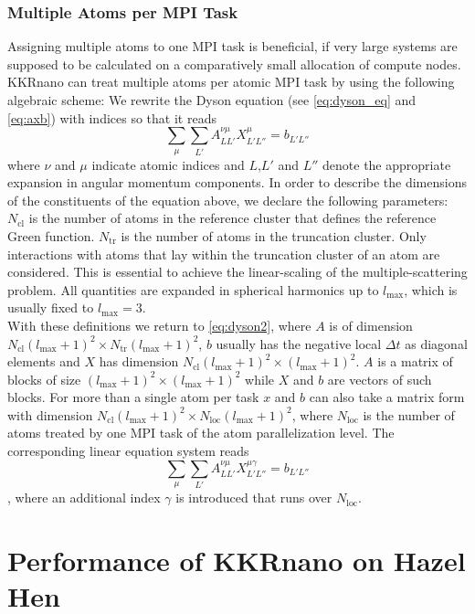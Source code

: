 \documentclass [a4paper, 12pt]{article}
\newcommand{\beq}{\begin{equation}}
\newcommand{\eeq}{\end{equation}}
\begin{document}
\subsubsection*{Multiple Atoms per MPI Task}

Assigning multiple atoms to one MPI task is beneficial, if very large systems are
supposed to be calculated on a comparatively small allocation of compute nodes.
\\
KKRnano can treat multiple atoms per atomic MPI task by using the following algebraic scheme: 
We rewrite the Dyson equation (see \cref{eq:dyson_eq} and \cref{eq:axb}) with indices so that it reads
\beq
\sum_{\mu} \sum_{L'} A^{\nu \mu}_{LL'} X^{\mu}_{L'L''} = b_{L'L''}
\label{eq:dyson2}
\eeq
where $\nu$ and $\mu$ indicate atomic indices and $L$,$L'$ and $L''$ denote
the appropriate expansion in angular momentum components.
In order to describe the dimensions of the constituents of the equation above, we
declare the following parameters:
$N_{\text{cl}}$ is the number of atoms in the reference cluster that defines the reference Green function.
$N_{\text{tr}}$ is the number of atoms in the truncation cluster. Only interactions with atoms that lay 
within the truncation cluster of an atom are considered. This is essential to achieve
the linear-scaling of the multiple-scattering problem. 
All quantities are expanded in spherical harmonics up to $l_{\text{max}}$, which is usually fixed to
$l_{\text{max}}=3$.
\\
With these definitions we return to \cref{eq:dyson2}, where $A$ is of dimension 
$N_{\text{cl}} (l_{\text{max}}+1)^2 \times N_{\text{tr}} (l_{\text{max}}+1)^2$,
$b$ usually has the
negative local $\Delta t$ as diagonal elements
and $X$ has dimension $N_{\text{cl}} (l_{\text{max}}+1)^2 \times (l_{\text{max}}+1)^2$.
$A$ is a matrix of blocks of size ${(l_{\text{max}}+1)}^2 \times {(l_{\text{max}}+1)}^2$
while $X$ and $b$ are vectors
of such blocks. For more than a single atom per task $x$ and $b$ can also take a matrix form
with dimension $N_{\text{cl}} (l_{\text{max}}+1)^2 \times N_{\text{loc}} (l_{\text{max}}+1)^2$, where
$N_{\text{loc}}$ is the number of atoms treated by one MPI task of the atom parallelization level.
The corresponding linear equation system reads
\beq
\label{eq:dyson_equation_lap_multi}
\sum_{\mu} \sum_{L'} A^{\nu \mu}_{LL'} X^{\mu \gamma}_{L'L''} = b_{L'L''}
\eeq
, where an additional index $\gamma$ is introduced that runs over $N_{\text{loc}}$. 

\section{Performance of KKRnano on Hazel Hen}
\label{sec:performance}
\end{document}
